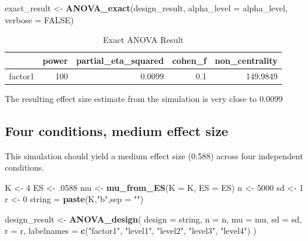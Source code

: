 \documentclass[]{book}
\newenvironment{Shaded}{\begin{snugshade}}{\end{snugshade}}
\newcommand{\DataTypeTok}[1]{\textcolor[rgb]{0.13,0.29,0.53}{#1}}
\newcommand{\DecValTok}[1]{\textcolor[rgb]{0.00,0.00,0.81}{#1}}
\newcommand{\FloatTok}[1]{\textcolor[rgb]{0.00,0.00,0.81}{#1}}
\newcommand{\KeywordTok}[1]{\textcolor[rgb]{0.13,0.29,0.53}{\textbf{#1}}}
\newcommand{\NormalTok}[1]{#1}
\newcommand{\OtherTok}[1]{\textcolor[rgb]{0.56,0.35,0.01}{#1}}
\newcommand{\StringTok}[1]{\textcolor[rgb]{0.31,0.60,0.02}{#1}}
\begin{document}
\begin{Shaded}
\begin{Highlighting}[]
\NormalTok{exact_result <-}\StringTok{ }\KeywordTok{ANOVA_exact}\NormalTok{(design_result,}
                            \DataTypeTok{alpha_level =}\NormalTok{ alpha_level,}
                            \DataTypeTok{verbose =} \OtherTok{FALSE}\NormalTok{)}
\end{Highlighting}
\end{Shaded}

\begin{table}[!h]

\caption{\label{tab:unnamed-chunk-82}Exact ANOVA Result}
\centering
\begin{tabular}{l|r|r|r|r}
\hline
  & power & partial\_eta\_squared & cohen\_f & non\_centrality\\
\hline
factor1 & 100 & 0.0099 & 0.1 & 149.9849\\
\hline
\end{tabular}
\end{table}

The resulting effect size estimate from the simulation is very close to 0.0099

\hypertarget{four-conditions-medium-effect-size}{%
\subsection{Four conditions, medium effect size}\label{four-conditions-medium-effect-size}}

This simulation should yield a medium effect size (0.588) across four independent conditions.

\begin{Shaded}
\begin{Highlighting}[]
\NormalTok{K <-}\StringTok{ }\DecValTok{4}
\NormalTok{ES <-}\StringTok{ }\FloatTok{.0588}
\NormalTok{mu <-}\StringTok{ }\KeywordTok{mu_from_ES}\NormalTok{(}\DataTypeTok{K =}\NormalTok{ K, }\DataTypeTok{ES =}\NormalTok{ ES)}
\NormalTok{n <-}\StringTok{ }\DecValTok{5000}
\NormalTok{sd <-}\StringTok{ }\DecValTok{1}
\NormalTok{r <-}\StringTok{ }\DecValTok{0}
\NormalTok{string =}\StringTok{ }\KeywordTok{paste}\NormalTok{(K,}\StringTok{"b"}\NormalTok{,}\DataTypeTok{sep =} \StringTok{""}\NormalTok{)}
\end{Highlighting}
\end{Shaded}

\begin{Shaded}
\begin{Highlighting}[]
\NormalTok{design_result <-}\StringTok{ }\KeywordTok{ANOVA_design}\NormalTok{(}
  \DataTypeTok{design =}\NormalTok{ string,}
  \DataTypeTok{n =}\NormalTok{ n,}
  \DataTypeTok{mu =}\NormalTok{ mu,}
  \DataTypeTok{sd =}\NormalTok{ sd,}
  \DataTypeTok{r =}\NormalTok{ r,}
  \DataTypeTok{labelnames =} \KeywordTok{c}\NormalTok{(}\StringTok{"factor1"}\NormalTok{, }\StringTok{"level1"}\NormalTok{, }\StringTok{"level2"}\NormalTok{, }\StringTok{"level3"}\NormalTok{, }\StringTok{"level4"}\NormalTok{)}
\NormalTok{  )}
\end{Highlighting}
\end{Shaded}
\end{document}
